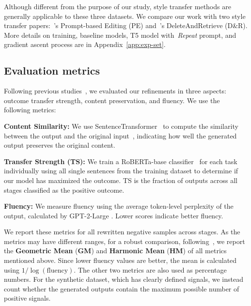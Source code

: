 \documentclass{article}
\begin{document}
Although different from the purpose of our study, style transfer methods are generally applicable to these three datasets. We compare our work with two style transfer papers:~\citet{luo-etal-2023-prompt}'s Prompt-based Editing (PE) and~\citet{li2018delete}'s DeleteAndRetrieve (D\&R). More details on training, baseline models, T5 model with~\textit{Repeat} prompt, and gradient ascent process are in Appendix~\ref{app:exp-set}.

\subsection{Evaluation metrics}
Following previous studies~\cite{luo-etal-2023-prompt,he2016ups,suzgun2022prompt}, we evaluated our refinements in three aspects: outcome transfer strength, content preservation, and fluency. We use the following metrics:

\textbf{Content Similarity:} We use SentenceTransformer~\cite{reimers2019sentence} to compute the similarity between the output and the original input~\cite{hallinan2023steer,luo-etal-2023-prompt}, indicating how well the generated output preserves the original content.

\textbf{Transfer Strength (TS):} We train a RoBERTa-base classifier~\cite{liu2019roberta} for each task individually using all single sentences from the training dataset to determine if our model has maximized the outcome. TS is the fraction of outputs across all stages classified as the positive outcome.

\textbf{Fluency:} We measure fluency using the average token-level perplexity of the output, calculated by GPT-2-Large \cite{radford2019language}. Lower scores indicate better fluency. 

We report these metrics for all rewritten negative samples across stages. As the metrics may have different ranges, for a robust comparison, following~\citet{luo-etal-2023-prompt,li2020unsupervised}, we report the \textbf{Geometric Mean} (\textbf{GM}) and \textbf{Harmonic Mean} (\textbf{HM}) of all metrics mentioned above. Since lower fluency values are better, the mean is calculated using $1/\log(\text{fluency})$. The other two metrics are also used as percentage numbers. For the synthetic dataset, which has clearly defined signals, we instead count whether the generated outputs contain the maximum possible number of positive signals.
\end{document}
